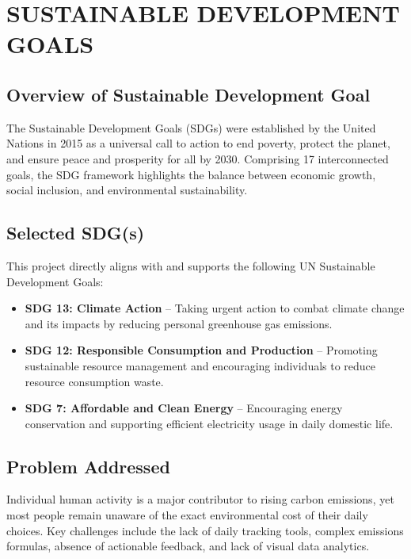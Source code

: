 \documentclass[12pt,a4paper]{report}
\begin{document}
\chapter{SUSTAINABLE DEVELOPMENT GOALS}

\section{Overview of Sustainable Development Goal}
The Sustainable Development Goals (SDGs) were established by the United Nations in 2015 as a universal call to action to end poverty, protect the planet, and ensure peace and prosperity for all by 2030. Comprising 17 interconnected goals, the SDG framework highlights the balance between economic growth, social inclusion, and environmental sustainability.

\section{Selected SDG(s)}
This project directly aligns with and supports the following UN Sustainable Development Goals:
\begin{itemize}
    \item \textbf{SDG 13: Climate Action} -- Taking urgent action to combat climate change and its impacts by reducing personal greenhouse gas emissions.
    \item \textbf{SDG 12: Responsible Consumption and Production} -- Promoting sustainable resource management and encouraging individuals to reduce resource consumption waste.
    \item \textbf{SDG 7: Affordable and Clean Energy} -- Encouraging energy conservation and supporting efficient electricity usage in daily domestic life.
\end{itemize}

\section{Problem Addressed}
Individual human activity is a major contributor to rising carbon emissions, yet most people remain unaware of the exact environmental cost of their daily choices. Key challenges include the lack of daily tracking tools, complex emissions formulas, absence of actionable feedback, and lack of visual data analytics.
\end{document}
